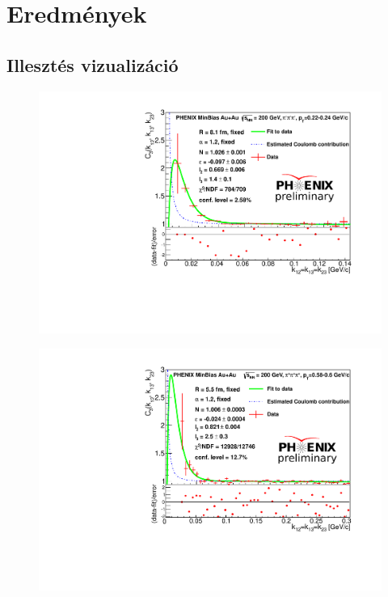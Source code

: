 \documentclass[10pt,a4paper]{article}
\numberwithin{equation}{subsection}
\numberwithin{figure}{section}
\begin{document}
\section{Eredmények}
\subsection{Illesztés vizualizáció}
\begin{figure}[H]
\centering
\includegraphics[scale=0.6]{pic/res/diag_lowpt.pdf}
\end{figure}
\begin{figure}[H]
\centering
\includegraphics[scale=0.6]{pic/res/diag_highpt.pdf}
\end{figure}
\end{document}
